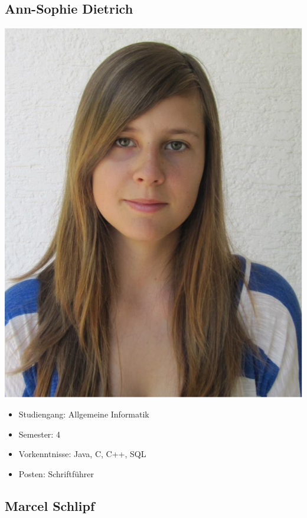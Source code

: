 \subsection{Ann-Sophie Dietrich}
\begin{minipage}{0.28\textwidth} 
\includegraphics[width=\textwidth]{content/pictures/Sophie.jpg}
\end{minipage}%
\begin{minipage}{0.7\textwidth}
\begin{itemize}
 \item Studiengang: Allgemeine Informatik
  \item Semester: 4
  \item Vorkenntnisse: Java, C, C++, SQL
  \item Posten: Schriftführer
\end{itemize}
\end{minipage}

\subsection{Marcel Schlipf}

